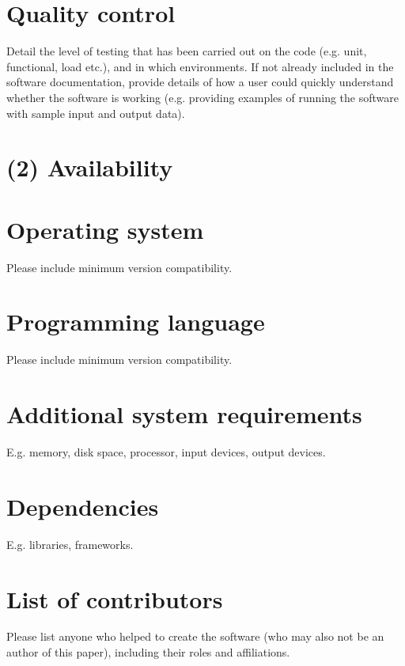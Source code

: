 \documentclass{jors}
\begin{document}
\section*{Quality control}

Detail the level of testing that has been carried out on the code (e.g. unit, functional, load etc.), and in which environments. If not already included in the software documentation, provide details of how a user could quickly understand whether the software is working (e.g. providing examples of running the software with sample input and output data). 

\section*{(2) Availability}
\vspace{0.5cm}

\section*{Operating system}

Please include minimum version compatibility.

\section*{Programming language}

Please include minimum version compatibility.

\section*{Additional system requirements}

E.g. memory, disk space, processor, input devices, output devices.

\section*{Dependencies}

E.g. libraries, frameworks.

\section*{List of contributors}

Please list anyone who helped to create the software (who may also not be an author of this paper), including their roles and affiliations.
\end{document}
